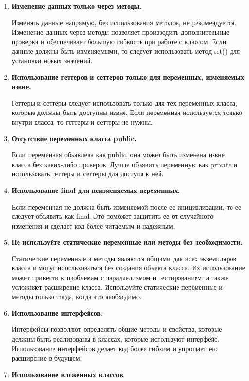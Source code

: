\documentclass[12pt, a4paper]{book}%
\begin{document}
{\begin{enumerate}
\item {\bf Изменение данных только через методы.}

Изменять данные напрямую, без использования методов, не рекомендуется. Изменение данных через методы позволяет производить дополнительные проверки и обеспечивает большую гибкость при работе с классом. Если данные должны быть изменяемыми, то следует использовать метод set() для установки новых значений.

\item {\bf Использование геттеров и сеттеров только для переменных, изменяемых извне.}

Геттеры и сеттеры следует использовать только для тех переменных класса, которые должны быть доступны извне. Если переменная используется только внутри класса, то геттеры и сеттеры не нужны.

\item {\bf Отсутствие переменных класса public.}

Если переменная объявлена как public, она может быть изменена извне класса без каких-либо проверок. Лучше объявить переменную как private и использовать геттеры и сеттеры для доступа к ней. 

\item {\bf Использование final для неизменяемых переменных.}

Если переменная не должна быть изменяемой после ее инициализации, то ее следует объявить как final. Это поможет защитить ее от случайного изменения и сделает код более читаемым и надежным. 

\item {\bf Не используйте статические переменные или методы без необходимости.}

Статические переменные и методы являются общими для всех экземпляров класса и могут использоваться без создания объекта класса. Их использование может привести к проблемам с параллелизмом и тестированием, а также усложняет расширение класса. Используйте статические переменные и методы только тогда, когда это необходимо.

\item {\bf Использование интерфейсов.}

Интерфейсы позволяют определять общие методы и свойства, которые должны быть реализованы в классах, которые используют интерфейс. Использование интерфейсов делает код более гибким и упрощает его расширение в будущем.

\item {\bf Использование вложенных классов.}


\end{enumerate}}
\end{document}
